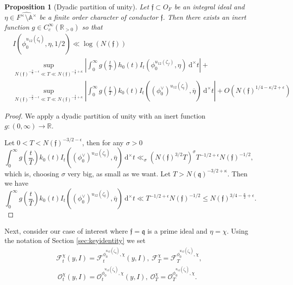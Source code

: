 \documentclass[a4paper,11pt]{amsart}
\newtheorem{proposition}[theorem]{Proposition}
\theoremstyle{definition}
\newcommand{\A}{\mathbb{A}}
\newcommand{\R}{\mathbb{R}}
\begin{document}
\begin{proposition}[Dyadic partition of unity]Let $\mathfrak{f} \subset O_F$ be an integral ideal and $\eta \in \widehat{F^{\times}\setminus\A^{\times}}$ be a finite order character of conductor $\mathfrak{f}$.
Then there exists an inert function $g\in C_c^{\infty}(\R_{>0})$ so that 
\begin{align*}&I(\phi_0^{u_{12}(\zeta_\mathfrak{f})},\eta,1/2) \ll \log(N(\mathfrak{f}))\\&\sup_{N(\mathfrak{f})^{-\frac{3}{2}-\epsilon}\ll T\ll N(\mathfrak{f})^{-\frac{3}{2}+\kappa}}\left\vert\int_{0}^{\infty}g\left(\frac{t}{T}\right)h_0(t)I_t(\phi_0^{u_{12}(\zeta_f)},\eta)\ \mathrm{d}^{\times}t \right\vert+ \\&\sup_{N(\mathfrak{f})^{-\frac{3}{2}-\epsilon}\ll T\ll N(\mathfrak{f})^{-\frac{3}{2}+\kappa}} \left\vert \int_{0}^{\infty}g\left(\frac{t}{T}\right)k_0(t)I_{t}((\phi_0^{\vee})^{u_{12}(\zeta_\mathfrak{f})},\overline{\eta})\ \mathrm{d}^{\times}t\right\vert +O(N(\mathfrak{f})^{1/4-\kappa/2+\epsilon})  
\end{align*}
\end{proposition}
\begin{proof} We apply a dyadic partition of unity with an inert function $g\colon (0,\infty)\to \R$. 


Let $0<T< N(\mathfrak f)^{-3/2-\epsilon}$, then for any $\sigma >0$
\[\int_{0}^{\infty}g\left(\frac{t}{T}\right)k_0(t)I_t((\phi_0^{\vee})^{u_{12}(\zeta_\mathfrak{f})},\overline \eta)\ \mathrm{d}^{\times}t\ll_{\sigma} (N(\mathfrak{f})^{3/2}T)^{\sigma}T^{-1/2+\epsilon}N(\mathfrak{f})^{-1/2}, \]
which is, choosing $\sigma$ very big, as small as we want. Let $T>N(\mathfrak{q})^{-3/2+\kappa}$. Then we have
\[\int_{0}^{\infty}g\left(\frac{t}{T}\right)k_0(t)I_t((\phi_0^{\vee})^{u_{12}(\zeta_\mathfrak{f})},\overline \eta) \ \mathrm{d}^{\times}t \ll T^{-1/2+\epsilon}N(\mathfrak{f})^{-1/2} \leq N(\mathfrak{f})^{3/4-\frac{\kappa}{2}+\epsilon}. \]
\end{proof}
Next, consider our case of interest where $\mathfrak{f} = \mathfrak{q}$ is a prime ideal and $\eta = \chi$.
Using the notation of Section \ref{sec:keyidentity} we set
\begin{align*}\mathcal{F}_t^{\chi}(y,I) = \mathcal{F
}_t^{\phi_0^{u_{12}(\zeta_\mathfrak q)},\chi}(y,I),\ \mathcal{F}_T^{\chi} = \mathcal{F
}_T^{\phi_0^{u_{12}(\zeta_\mathfrak q)},\chi}, \\\ \mathcal O_t^{\chi}(y,I) = \mathcal{O}_t^{\phi_0^{u_{12}(\zeta_\mathfrak q)},\chi}(y,I), \ \mathcal{O}_T^{\chi} = \mathcal{O}_T^{\phi_0^{u_{12}(\zeta_\mathfrak q)},\chi}. \end{align*}
\end{document}
